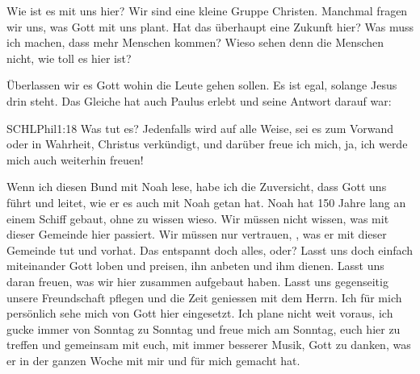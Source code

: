         Wie ist es mit uns hier? Wir sind eine kleine Gruppe Christen. Manchmal fragen wir uns, was Gott mit uns plant. Hat das überhaupt eine Zukunft hier? Was muss ich machen, dass mehr Menschen kommen? Wieso sehen denn die Menschen nicht, wie toll es hier ist?
        
        Überlassen wir es Gott wohin die Leute gehen sollen. Es ist egal, solange Jesus drin steht. Das Gleiche hat auch Paulus erlebt und seine Antwort darauf war:
        \begin{bibelquote}{SCHL}{Phil}{1:18}
            Was tut es? Jedenfalls wird auf alle Weise, sei es zum Vorwand oder in Wahrheit, Christus verkündigt, und darüber freue ich mich, ja, ich werde mich auch weiterhin freuen!
        \end{bibelquote}        
        Wenn ich diesen Bund mit Noah lese, habe ich die Zuversicht, dass Gott uns führt und leitet, wie er es auch mit Noah getan hat. Noah hat 150 Jahre lang an einem Schiff gebaut, ohne zu wissen wieso. Wir müssen nicht wissen, was mit dieser Gemeinde hier passiert. Wir müssen nur vertrauen, , was er mit dieser Gemeinde tut und vorhat. Das entspannt doch alles, oder? Lasst uns doch einfach miteinander Gott loben und preisen, ihn anbeten und ihm dienen. Lasst uns daran freuen, was wir hier zusammen aufgebaut haben. Lasst uns gegenseitig unsere Freundschaft pflegen und die Zeit geniessen mit dem Herrn. Ich für mich persönlich sehe mich von Gott hier eingesetzt. Ich plane nicht weit voraus, ich gucke immer von Sonntag zu Sonntag und freue mich am Sonntag, euch hier zu treffen und gemeinsam mit euch, mit immer besserer Musik, Gott zu danken, was er in der ganzen Woche mit mir und für mich gemacht hat.
